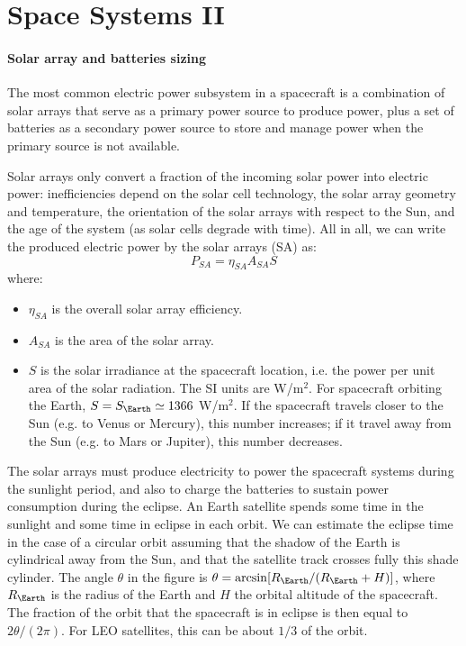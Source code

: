 \section[Space Systems II]{Space Systems II}
 
\paragraph{Solar array and batteries sizing}

The most common electric power subsystem in a spacecraft is a combination of
solar arrays that serve as a primary power source to produce power, plus a set
of batteries as a secondary power source to store and manage power when  the
primary source is not available.

Solar arrays only convert a fraction of
the incoming solar power into electric power: inefficiencies depend on the
solar cell technology, the solar array geometry and temperature, the
orientation of the solar arrays with respect to the Sun, and the age of the
system (as solar cells degrade with time). All in all, we can write the
produced electric  power by the solar arrays (SA) as:
%
\begin{equation}
P_{SA} = \eta_{SA} A_{SA} S
\end{equation}
%
where:
%
\begin{itemize}
\item $\eta_{SA}$ is the overall solar array efficiency.
\item $A_{SA}$ is the area of the solar array.
\item $S$ is the solar irradiance at the spacecraft location, i.e. the 
power per unit area of the solar radiation. The SI units are W/m$^2$. 
For spacecraft orbiting the Earth, $S=S_{\Earth}\simeq 1366$ W/m$^2$. If the 
spacecraft travels closer to the Sun (e.g. to Venus or Mercury), this number 
increases; if it travel away from the Sun (e.g. to Mars or Jupiter), this 
number decreases.
\end{itemize}
%

The solar arrays must produce electricity to power the spacecraft systems
during the sunlight period, and also to charge the batteries to sustain
power consumption during the eclipse. 
An Earth satellite spends some time in the sunlight and some time in eclipse
in each orbit. We can estimate the eclipse time in the case of a circular
orbit assuming that the shadow of the Earth is cylindrical away from the Sun,
and that the satellite track crosses fully this shade cylinder.
The angle $\theta$ in the figure is 
$\theta = \arcsin[R_\Earth/(R_\Earth+H)]$, where
$R_\Earth$ is the radius of the Earth and $H$ the orbital altitude of the
spacecraft. The fraction of the orbit that the spacecraft is in eclipse
is then equal to $2\theta/(2\pi)$. For LEO satellites, this can be about
$1/3$ of the orbit.

